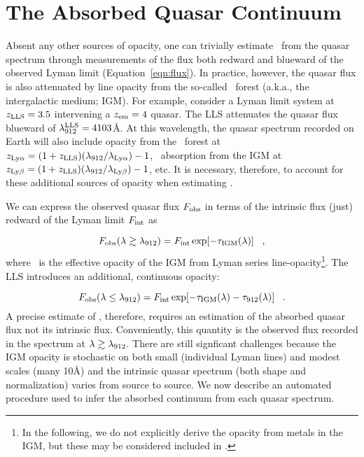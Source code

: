 \documentclass[12pt,preprint]{aastex}
\begin{document}
\section{The Absorbed Quasar Continuum}
\label{sec:continuum}

Absent any other sources of opacity, one can trivially
estimate \tll\ from
the quasar spectrum through measurements of the flux
both redward and blueward of the observed Lyman limit (Equation~\ref{eqn:flux}).  
In practice, however,
the quasar flux is also attenuated by line opacity from the so-called
\lya\ forest (a.k.a., the intergalactic medium; IGM).
For example, consider a Lyman limit system at $z_{\rm LLS} = 3.5$
intervening a $z_{\rm em} = 4$ quasar.  The LLS attenuates the quasar flux
blueward of $\lambda_{\rm 912}^{\rm LLS} = 4103$\AA.  At this wavelength,
the quasar spectrum recorded on Earth will also include opacity
from the \lya\ forest at 
$z_{\rm Ly\alpha} = (1+z_{\rm LLS})(\lambda_{\rm 912}/\lambda_{\rm Ly\alpha}) - 1$,
\lyb\ absorption from the IGM at 
$z_{\rm Ly\beta} = (1+z_{\rm LLS})(\lambda_{\rm 912}/\lambda_{\rm Ly\beta}) - 1$, etc.
It is necessary, therefore, to account for these additional sources
of opacity when estimating \tll.

We can express
the observed quasar flux $F_{\rm obs}$ in terms of
the intrinsic flux (just) redward of the Lyman limit $F_{\rm int}$ as

\begin{equation}
F_{\rm obs} (\lambda \gtrsim \lambda_{\rm 912}) = F_{\rm int} \exp [-\tau_{\rm IGM}(\lambda)] \;\;\; ,
\end{equation}
where \tigm\ is the effective opacity of the IGM from
Lyman series line-opacity\footnote{In the following, we do not
explicitly derive the 
opacity from metals in the IGM, but these may be considered included in \tigm.}.
The LLS introduces an additional, continuous opacity: 

\begin{equation}
F_{\rm obs} (\lambda \le \lambda_{\rm 912}) = 
  F_{\rm int} \exp [-\tau_{\rm IGM}(\lambda) -\tau_{\rm 912}(\lambda)] \;\;\; .
\end{equation}
A precise estimate of \tll, therefore, requires an estimation
of the absorbed quasar flux not its intrinsic flux.  Conveniently,
this quantity is the observed flux recorded in the spectrum at
$\lambda \gtrsim \lambda_{\rm 912}$.  
There are still signficant challenges because
the IGM opacity is stochastic on both small (individual Lyman lines)
and modest scales (many 10\AA) 
and 
the intrinsic quasar spectrum (both shape and normalization) varies
from source to source.
We now describe an automated procedure
used to infer the absorbed continuum from each quasar spectrum.
\end{document}
